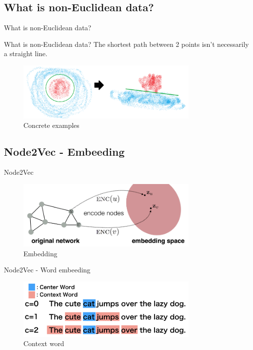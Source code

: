 \subsection{What is non-Euclidean data?}
\begin{frame}{What is non-Euclidean data?}
    \begin{block}{What is non-Euclidean data?}
        The shortest path between 2 points isn't necessarily a straight line.
    \end{block}

    \begin{figure}[htp]
        \centering
        \includegraphics[width=0.8\textwidth]{topics/201010-zhang2019comprehensive/assets/img/concrete_plot.png}
        \caption{Concrete examples}
    \end{figure}
\end{frame}

\subsection{Node2Vec - Embeeding}
\begin{frame}{Node2Vec}
    \begin{figure}[htp]
        \centering
        \includegraphics[width=0.8\textwidth]{topics/201010-zhang2019comprehensive/assets/img/euclid_space.png}
        \caption{Embedding}
    \end{figure}
\end{frame}

\begin{frame}{Node2Vec - Word embeeding}
    \begin{figure}[htp]
        \centering
        \includegraphics[width=0.8\textwidth]{topics/201010-zhang2019comprehensive/assets/img/context-word.png}
        \caption{Context word}
    \end{figure}
\end{frame}

